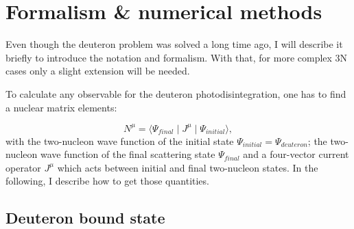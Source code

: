\chapter{Formalism \& numerical methods}
\label{sec:formalism}

Even though the deuteron problem was solved a long time ago, I will describe it briefly 
to introduce the notation and formalism. 
With that, for more complex 3N cases only a slight 
extension will be needed.

To calculate any observable for the deuteron photodisintegration,
one has to find a nuclear matrix elements:

\begin{equation}
    N^\mu = \langle \Psi_{final} \mid J^\mu \mid \Psi_{initial} \rangle, 
    \label{main}
\end{equation}
with the two-nucleon wave function of the initial state $\Psi_{initial}  = \Psi_{deuteron}$;
the two-nucleon wave function of the final scattering state $\Psi_{final}$ 
and a four-vector current operator $J^\mu$ which acts between initial and final 
two-nucleon states. In the following, I describe how to get those quantities.




\section{Deuteron bound state}
    \label{sec:deut_bound}

